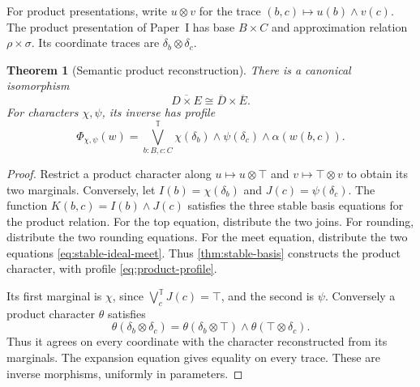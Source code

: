 \documentclass[11pt,a4paper]{article}
\numberwithin{equation}{section}
\newtheorem{theorem}{Theorem}[section]
\theoremstyle{definition}
\theoremstyle{remark}
\theoremstyle{plain}
\newcommand{\TV}{\mathbb T}
\newcommand{\joinT}{\bigvee^{\TV}}
\begin{document}
For product presentations, write $u\otimes v$ for the trace
$(b,c)\mapsto u(b)\wedge v(c)$. The product presentation of Paper~I
has base $B\times C$ and approximation relation $\rho\times\sigma$.
Its coordinate traces are $\delta_b\otimes\delta_c$.

\begin{theorem}[Semantic product reconstruction]
\label{thm:semantic-products}
There is a canonical isomorphism
\begin{equation}\label{eq:semantic-product}
 \overline{D\times E}\cong\overline D\times\overline E.
\end{equation}
For characters $\chi,\psi$, its inverse has profile
\begin{equation}\label{eq:product-profile}
 \Phi_{\chi,\psi}(w)=
 \joinT_{b:B,c:C}
 \chi(\delta_b)\wedge\psi(\delta_c)\wedge\alpha(w(b,c)).
\end{equation}
\end{theorem}
\begin{proof}
Restrict a product character along $u\mapsto u\otimes\top$ and
$v\mapsto\top\otimes v$ to obtain its two marginals. Conversely,
let $I(b)=\chi(\delta_b)$ and $J(c)=\psi(\delta_c)$. The function
$K(b,c)=I(b)\wedge J(c)$ satisfies the three stable basis equations
for the product relation. For the top equation, distribute the two
joins. For rounding, distribute the two rounding equations. For the
meet equation, distribute the two equations
\eqref{eq:stable-ideal-meet}. Thus \cref{thm:stable-basis} constructs
the product character, with profile \eqref{eq:product-profile}.

Its first marginal is $\chi$, since $\joinT_cJ(c)=\top$, and the
second is $\psi$. Conversely a product character $\theta$ satisfies
\[
 \theta(\delta_b\otimes\delta_c)
 =\theta(\delta_b\otimes\top)\wedge
  \theta(\top\otimes\delta_c).
\]
Thus it agrees on every coordinate with the character reconstructed
from its marginals. The expansion equation gives equality on every
trace. These are inverse morphisms, uniformly in parameters.
\end{proof}
\end{document}
